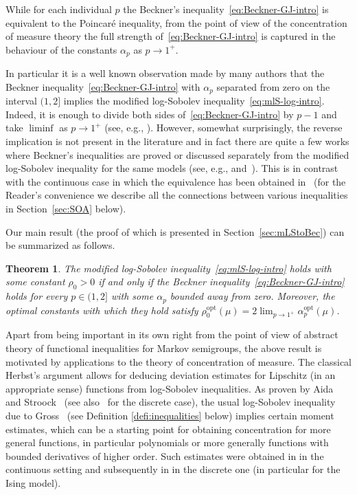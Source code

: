 \documentclass[a4paper]{amsart}
\newtheorem{theorem}{Theorem}[section]
\theoremstyle{definition}
\theoremstyle{remark}
\numberwithin{equation}{section}
\newcommand*{\opt}{\text{opt}}
\begin{document}
While for each individual $p$ the Beckner's inequality~\eqref{eq:Beckner-GJ-intro} is equivalent to the Poincar\'e inequality, from the point of view of the concentration of measure theory the full strength of~\eqref{eq:Beckner-GJ-intro} is captured in the behaviour of the constants $\alpha_p$ as $p\to 1^+$.

In particular it is a well known observation made by many authors that the Beckner inequality~\eqref{eq:Beckner-GJ-intro} with $\alpha_p$ separated from zero on the interval $(1,2]$ implies the modified log-Sobolev inequality~\eqref{eq:mlS-log-intro}.
Indeed, it is enough to divide both sides of~\eqref{eq:Beckner-GJ-intro} by $p-1$ and take $\liminf$ as $p \to 1^+$ (see, e.g., \cite{MR2283379,MR3078024,MR3693525}).
However, somewhat surprisingly, the reverse implication is not present in the literature and in fact there are quite a few works where Beckner's inequalities are proved or discussed separately from the modified log-Sobolev inequality for the same models (see, e.g., \cite{MR1989444,MR2123200} and~\cite{MR2283379,MR3078024,MR3693525,conforti2020probabilistic,weber2020entropy}).
This is in contrast with the continuous case in which the equivalence has been obtained in~\cite{MR1796718} (for the Reader's convenience we describe all the connections between various inequalities in Section~\ref{sec:SOA} below).

Our main result (the proof of which is presented in Section~\ref{sec:mLStoBec}) can be summarized as follows.
\begin{theorem}\label{thm:main-intro}
  The modified log-Sobolev inequality~\eqref{eq:mlS-log-intro} holds with some constant $\rho_0>0$ if and only if the Beckner inequality~\eqref{eq:Beckner-GJ-intro} holds for every $p\in(1,2]$ with some $\alpha_p$ bounded away from zero.
Moreover,  the optimal constants with which they  hold satisfy $\rho^\opt_0(\mu) =2 \lim_{p\to 1^+}\alpha_p^\opt(\mu)$.
\end{theorem}

Apart from being important in its own right from the point of view of abstract theory of functional inequalities for Markov semigroups, the above result is motivated by applications to the theory of concentration of measure.
The classical Herbst's argument allows for deducing deviation estimates for Lipschitz (in an appropriate sense) functions from log-Sobolev inequalities.
As proven by Aida and Stroock~\cite{MR1258492} (see also~\cite{Bobkov-growth} for the discrete case), the usual log-Sobolev inequality due to Gross~\cite{MR420249} (see Definition \ref{defi:inequalities} below) implies certain moment estimates, which can be a starting point for obtaining concentration for more general functions, in particular polynomials or more generally functions with bounded derivatives of higher order.
Such estimates were obtained in \cite{MR3383337,MR3670792,MR3743923} in the continuous setting and subsequently in \cite{gtze2018higher,MR3949267} in the discrete one (in particular for the Ising model).
\end{document}
